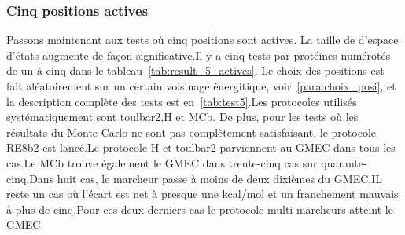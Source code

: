    \subsubsection{Cinq positions actives}
Passons maintenant aux tests où cinq positions sont actives. La taille de d'espace d'états augmente de façon significative.Il y a cinq tests par protéines numérotés de un à cinq dans le tableau~\ref{tab:result_5_actives}. Le choix des positions est fait aléatoirement sur un certain voisinage énergitique, voir~\ref{para:choix_posi}, et la description complète des tests est en~\ref{tab:test5}.Les protocoles utilisés systématiquement sont toulbar2,H et MCb. De plus, pour les tests où les résultats du Monte-Carlo ne sont pas complètement satisfaisant, le protocole RE8b2 est lancé.Le protocole H et toulbar2 parviennent au GMEC dans tous les cas.Le MCb trouve également le GMEC dans trente-cinq cas sur quarante-cinq.Dans huit cas, le marcheur passe à moins de deux dixièmes du GMEC.IL reste un cas où l'écart est net à presque une kcal/mol et un franchement mauvais à plus de cinq.Pour ces deux derniers cas le protocole multi-marcheurs atteint le GMEC.

